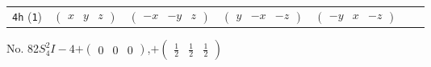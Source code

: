 \documentclass[fleqn,9pt,landscape]{jsarticle}
\begin{document}
\begin{center}
\begin{longtable}{ccccccc}
{\tt 4h} ({\tt 1}) & $ \begin{pmatrix} x & y & z \end{pmatrix} $ & $ \begin{pmatrix} - x & - y & z \end{pmatrix} $ & $ \begin{pmatrix} y & - x & - z \end{pmatrix} $ & $ \begin{pmatrix} - y & x & - z \end{pmatrix} $ \\
\end{longtable}
\end{center}
\newpage
No. 82\quad$S_{4}^{2}$\quad$I-4$\quad[ tetragonal ]\quad$+\begin{pmatrix} 0 & 0 & 0 \end{pmatrix}$,\quad $+\begin{pmatrix} \frac{1}{2} & \frac{1}{2} & \frac{1}{2} \end{pmatrix}$
\end{document}
